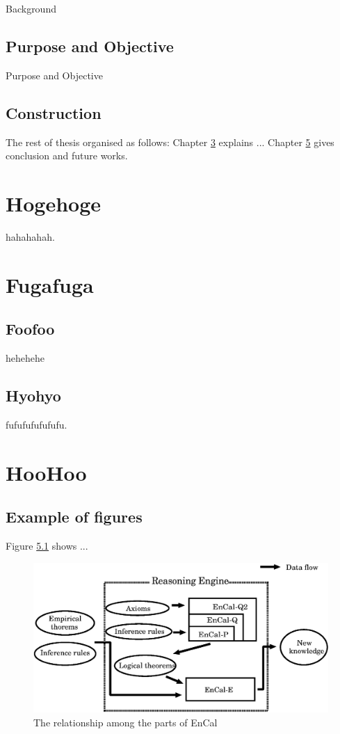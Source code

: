 \documentclass[12pt,epsf]{report}
\begin{document}
{{{{Background

\section{Purpose and Objective}

Purpose and Objective

\section{Construction}
The rest of thesis organised as follows:
Chapter \ref{chap:second} explains ... 
Chapter \ref{chap:third} gives conclusion and future works.


\chapter{Hogehoge} \label{chap:second}

hahahahah.

\chapter{Fugafuga}
\section{Foofoo}
hehehehe

\section{Hyohyo}

fufufufufufufu.

\chapter{HooHoo} \label{chap:third}

\section{Example of figures}

Figure \ref{fig:reasoning_engine} shows ...


 \begin{figure}[tb]
 \begin{center}
  \includegraphics[scale=0.6]{eps/reasoning_engine.eps}
  \caption{The relationship among the parts of EnCal}
  \label{fig:reasoning_engine}
 \end{center}
\end{figure}

}}}}
\end{document}
